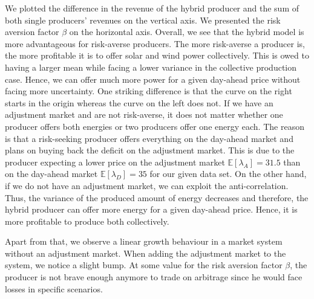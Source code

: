 We plotted the difference in the revenue of the hybrid producer and the sum of both single producers' revenues on the vertical axis. We presented the risk aversion factor $\beta$ on the horizontal axis. Overall, we see that the hybrid model is more advantageous for risk-averse producers. The more risk-averse a producer is, the more profitable it is to offer solar and wind power collectively. This is owed to having a larger mean while facing a lower variance in the collective production case. Hence, we can offer much more power for a given day-ahead price without facing more uncertainty. One striking difference is that the curve on the right starts in the origin whereas the curve on the left does not. If we have an adjustment market and are not risk-averse, it does not matter whether one producer offers both energies or two producers offer one energy each. The reason is that a risk-seeking producer offers everything on the day-ahead market and plans on buying back the deficit on the adjustment market. This is due to the producer expecting a lower price on the adjustment market $\mathbb{E}[\lambda_A]=31.5$ than on the day-ahead market $\mathbb{E}[\lambda_D]=35$ for our given data set.
On the other hand, if we do not have an adjustment market, we can exploit the anti-correlation. Thus, the variance of the produced amount of energy decreases and therefore, the hybrid producer can offer more energy for a given day-ahead price. Hence, it is more profitable to produce both collectively. 

Apart from that, we observe a linear growth behaviour in a market system without an adjustment market. When adding the adjustment market to the system, we notice a slight bump. At some value for the risk aversion factor $\beta$, the producer is not brave enough anymore to trade on arbitrage since he would face losses in specific scenarios. 
